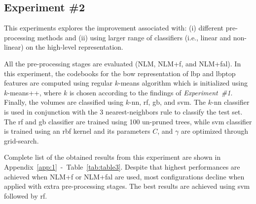 \subsection{Experiment \#2}\label{subsec:exp2}
This experiments explores the improvement associated with: (i) different pre-processing methods and (ii) using larger range of classifiers (i.e., linear and non-linear) on the high-level representation.

All the pre-processing stages are evaluated (NLM, NLM+\acs{f}, and NLM+\acs{fal}).
In this experiment, the codebooks for the \ac{bow} representation of \ac{lbp} and \ac{lbptop} features are computed using regular $k$-means algorithm which is initialized using $k$-means++, where $k$ is chosen according to the findings of \emph{Experiment~\#1}.
Finally, the volumes are classified using $k$-\ac{nn}, \ac{rf}, \ac{gb}, and \ac{svm}.
The $k$-\ac{nn} classifier is used in conjunction with the 3 nearest-neighbors rule to classify the test set.
The \ac{rf} and \ac{gb} classifier are trained using 100 un-pruned trees, while \ac{svm} classifier is trained using an \ac{rbf} kernel and its parameters $C$, and $\gamma$ are optimized through grid-search.

Complete list of the obtained results from this experiment are shown in Appendix~\ref{app:1}~-~Table~\ref{tab:table3}.
Despite that highest performances are achieved when NLM+\acs{f} or NLM+\acs{fal} are used, most configurations decline when applied with extra pre-processing stages.
The best results are achieved using \ac{svm} followed by \ac{rf}.
